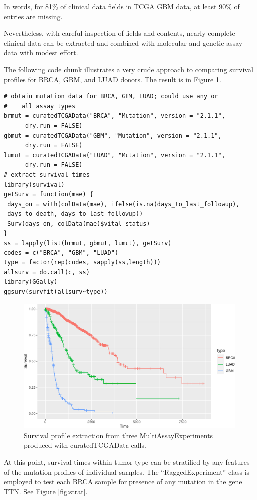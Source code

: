 \documentclass[graybox]{svmult}
\begin{document}
In words, for 81\% of clinical data fields in TCGA GBM data,
at least 90\% of entries are missing.

Nevertheless, with careful inspection of fields and contents,
nearly complete clinical data can be extracted and combined with molecular
and genetic assay data with modest effort.

The following code chunk illustrates a very crude
approach to comparing survival profiles for BRCA, GBM, and LUAD
donors. The result is in Figure \ref{fig:dothesurv}.


{\small
\begin{shaded}
\begin{verbatim}
# obtain mutation data for BRCA, GBM, LUAD; could use any or 
#    all assay types
brmut = curatedTCGAData("BRCA", "Mutation", version = "2.1.1", 
      dry.run = FALSE)
gbmut = curatedTCGAData("GBM", "Mutation", version = "2.1.1", 
      dry.run = FALSE)
lumut = curatedTCGAData("LUAD", "Mutation", version = "2.1.1", 
      dry.run = FALSE)
# extract survival times
library(survival)
getSurv = function(mae) {
 days_on = with(colData(mae), ifelse(is.na(days_to_last_followup),
 days_to_death, days_to_last_followup))
 Surv(days_on, colData(mae)$vital_status)
}
ss = lapply(list(brmut, gbmut, lumut), getSurv)
codes = c("BRCA", "GBM", "LUAD")
type = factor(rep(codes, sapply(ss,length)))
allsurv = do.call(c, ss)
library(GGally)
ggsurv(survfit(allsurv~type))
\end{verbatim}
\end{shaded}
}

\begin{figure}
\includegraphics[width=0.8\linewidth,]{bioccb_files/figure-latex/dothesurv-1} \caption{Survival profile extraction from three MultiAssayExperiments produced with curatedTCGAData calls.}\label{fig:dothesurv}
\end{figure}

At this point, survival times within tumor type can be stratified by any
features of the mutation profiles of individual samples.
The ``RaggedExperiment'' class is employed to test each BRCA sample for
presence of any mutation in the gene TTN. See Figure \ref{fig:strat}.
\end{document}
